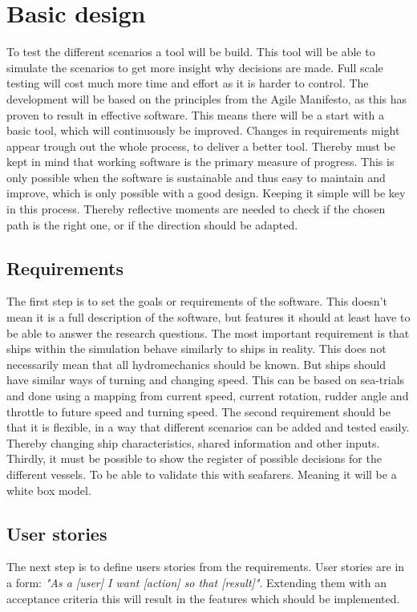 \chapter{Basic design}
To test the different scenarios a tool will be build. This tool will be able to simulate the scenarios to get more insight why decisions are made. Full scale testing will cost much more time and effort as it is harder to control. 
The development will be based on the principles from the Agile Manifesto, as this has proven to result in effective software. This means there will be a start with a basic tool, which will continuously be improved. Changes in requirements might appear trough out the whole process, to deliver a better tool. Thereby must be kept in mind that working software is the primary measure of progress. This is only possible when the software is sustainable and thus easy to maintain and improve, which is only possible with a good design. Keeping it simple will be key in this process. Thereby reflective moments are needed to check if the chosen path is the right one, or if the direction should be adapted.

\section{Requirements}
The first step is to set the goals or requirements of the software. This doesn't mean it is a full description of the software, but features it should at least have to be able to answer the research questions.
The most important requirement is that ships within the simulation behave similarly to ships in reality. This does not necessarily mean that all hydromechanics should be known. But ships should have similar ways of turning and changing speed. This can be based on sea-trials and done using a mapping from current speed, current rotation, rudder angle and throttle to future speed and turning speed.
The second requirement should be that it is flexible, in a way that different scenarios can be added and tested easily. Thereby changing ship characteristics, shared information and other inputs.
Thirdly, it must be possible to show the register of possible decisions for the different vessels. To be able to validate this with seafarers. Meaning it will be a white box model.

\section{User stories}
The next step is to define users stories from the requirements. User stories are in a form: \emph{"As a [user] I want [action] so that [result]"}. Extending them with an acceptance criteria this will result in the features which should be implemented.

